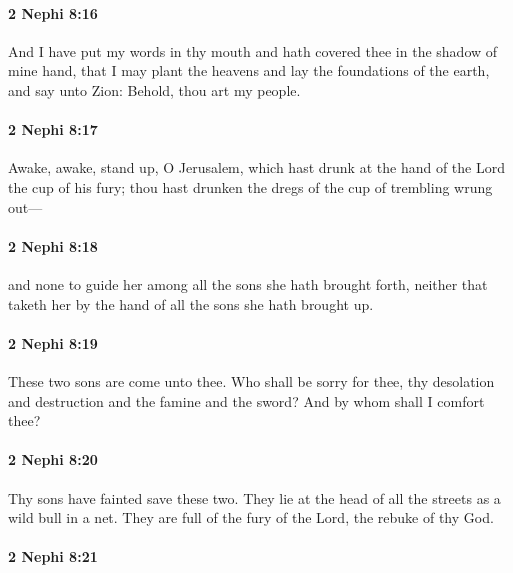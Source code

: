 		\paragraph{2 Nephi 8:16} %
			\label{2NEPHI-8-16}

			And I have put my words in thy mouth
			and hath covered thee in the shadow of mine hand,
			that I may plant the heavens and lay the foundations of the earth,
			and say unto Zion:
			Behold, thou art my people.

		\paragraph{2 Nephi 8:17} %
			\label{2NEPHI-8-17}

			Awake, awake, stand up, O Jerusalem,
			which hast drunk at the hand of the Lord the cup of his fury;
			thou hast drunken the dregs of the cup of trembling wrung out---

		\paragraph{2 Nephi 8:18} %
			\label{2NEPHI-8-18}

			and none to guide her among all the sons she hath brought forth,
			neither that taketh her by the hand of all the sons she hath brought up.

		\paragraph{2 Nephi 8:19} %
			\label{2NEPHI-8-19}

			These two sons are come unto thee.
			Who shall be sorry for thee,
			thy desolation and destruction and the famine and the sword?
			And by whom shall I comfort thee?

		\paragraph{2 Nephi 8:20} %
			\label{2NEPHI-8-20}

			Thy sons have fainted save these two.
			They lie at the head of all the streets as a wild bull in a net.
			They are full of the fury of the Lord, the rebuke of thy God.

		\paragraph{2 Nephi 8:21} %
			\label{2NEPHI-8-21}

